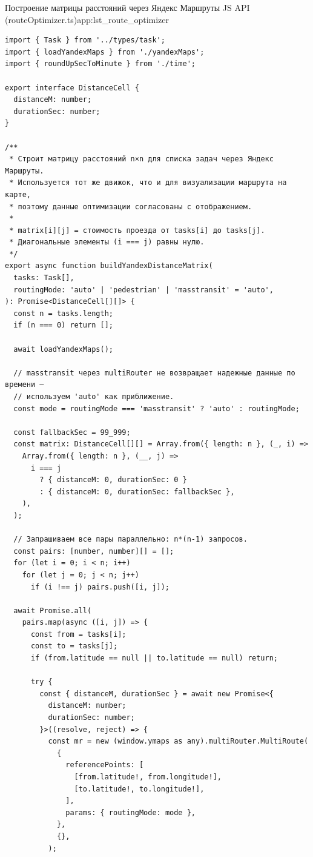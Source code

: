 \begin{codelisting}{Построение матрицы расстояний через Яндекс Маршруты JS API (routeOptimizer.ts)}{app:lst_route_optimizer}
    \begin{verbatim}
import { Task } from '../types/task';
import { loadYandexMaps } from './yandexMaps';
import { roundUpSecToMinute } from './time';

export interface DistanceCell {
  distanceM: number;
  durationSec: number;
}

/**
 * Строит матрицу расстояний n×n для списка задач через Яндекс Маршруты.
 * Используется тот же движок, что и для визуализации маршрута на карте,
 * поэтому данные оптимизации согласованы с отображением.
 *
 * matrix[i][j] = стоимость проезда от tasks[i] до tasks[j].
 * Диагональные элементы (i === j) равны нулю.
 */
export async function buildYandexDistanceMatrix(
  tasks: Task[],
  routingMode: 'auto' | 'pedestrian' | 'masstransit' = 'auto',
): Promise<DistanceCell[][]> {
  const n = tasks.length;
  if (n === 0) return [];

  await loadYandexMaps();

  // masstransit через multiRouter не возвращает надежные данные по времени —
  // используем 'auto' как приближение.
  const mode = routingMode === 'masstransit' ? 'auto' : routingMode;

  const fallbackSec = 99_999;
  const matrix: DistanceCell[][] = Array.from({ length: n }, (_, i) =>
    Array.from({ length: n }, (__, j) =>
      i === j
        ? { distanceM: 0, durationSec: 0 }
        : { distanceM: 0, durationSec: fallbackSec },
    ),
  );

  // Запрашиваем все пары параллельно: n*(n-1) запросов.
  const pairs: [number, number][] = [];
  for (let i = 0; i < n; i++)
    for (let j = 0; j < n; j++)
      if (i !== j) pairs.push([i, j]);

  await Promise.all(
    pairs.map(async ([i, j]) => {
      const from = tasks[i];
      const to = tasks[j];
      if (from.latitude == null || to.latitude == null) return;

      try {
        const { distanceM, durationSec } = await new Promise<{
          distanceM: number;
          durationSec: number;
        }>((resolve, reject) => {
          const mr = new (window.ymaps as any).multiRouter.MultiRoute(
            {
              referencePoints: [
                [from.latitude!, from.longitude!],
                [to.latitude!, to.longitude!],
              ],
              params: { routingMode: mode },
            },
            {},
          );


\end{verbatim}
\end{codelisting}
